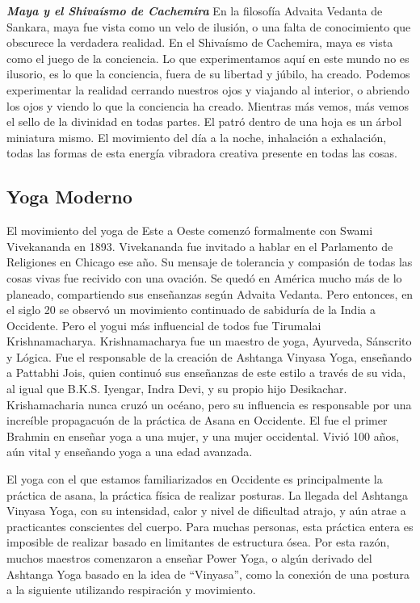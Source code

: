 \textbf{\textit{Maya y el Shivaísmo de Cachemira}}
En la filosofía Advaita Vedanta de Sankara, maya fue vista como un velo de ilusión, o una falta de conocimiento que obscurece la verdadera realidad. En el Shivaísmo de Cachemira, maya es vista como el juego de la conciencia. Lo que experimentamos aquí en este mundo no es ilusorio, es lo que la conciencia, fuera de su libertad y júbilo, ha creado. Podemos experimentar la realidad cerrando nuestros ojos y viajando al interior, o abriendo los ojos y viendo lo que la conciencia ha creado. Mientras más vemos, más vemos el sello de la divinidad en todas partes. El patró dentro de una hoja es un árbol miniatura mismo. El movimiento del día a la noche, inhalación a exhalación, todas las formas de esta energía vibradora creativa presente en todas las cosas.

\subsection{Yoga Moderno}
El movimiento del yoga de Este a Oeste comenzó formalmente con Swami Vivekananda en 1893. Vivekananda fue invitado a hablar en el Parlamento de Religiones en Chicago ese año. Su mensaje de tolerancia y compasión de todas las cosas vivas fue recivido con una ovación. Se quedó en Am\'erica mucho más de lo planeado, compartiendo sus enseñanzas según Advaita Vedanta. Pero entonces, en el siglo 20 se observó un movimiento continuado de sabiduría de la India a Occidente. Pero el yogui más influencial de todos fue Tirumalai Krishnamacharya. Krishnamacharya fue un maestro de yoga, Ayurveda, Sánscrito y Lógica. Fue el responsable de la creación de Ashtanga Vinyasa Yoga, enseñando a Pattabhi Jois, quien continuó sus enseñanzas de este estilo a trav\'es de su vida, al igual que B.K.S. Iyengar, Indra Devi, y su propio hijo Desikachar. Krishamacharia nunca cruzó un oc\'eano, pero su influencia es responsable por una increíble propagacuón de la práctica de Asana en Occidente. El fue el primer Brahmin en enseñar yoga a una mujer, y una mujer occidental. Vivió 100 años, aún vital y enseñando yoga a una edad avanzada.

El yoga con el que estamos familiarizados en Occidente es principalmente la práctica de asana, la práctica física de realizar posturas. La llegada del Ashtanga Vinyasa Yoga, con su intensidad, calor y nivel de dificultad atrajo, y aún atrae a practicantes conscientes del cuerpo. Para muchas personas, esta práctica entera es imposible de realizar basado en limitantes de estructura ósea. Por esta razón, muchos maestros comenzaron a enseñar Power Yoga, o algún derivado del Ashtanga Yoga basado en la idea de ``Vinyasa'', como la conexión de una postura a la siguiente utilizando respiración y movimiento.

